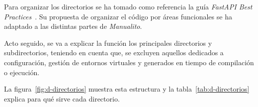 Para organizar los directorios se ha tomado como referencia la guía
\textit{FastAPI Best Practices}~\cite{zhanymkanov_fastapi_best_practices}.
Su propuesta de organizar el código por áreas funcionales se ha adaptado a
las distintas partes de \textit{Manualito}.

Acto seguido, se va a explicar la función los principales directorios y
subdirectorios, teniendo en cuenta que, se excluyen aquellos dedicados a
configuración, gestión de entornos virtuales y generados en tiempo de compilación
o ejecución.

La figura~\ref{fig:d-directorios} muestra esta estructura y la
tabla~\ref{tab:d-directorios} explica para qué sirve cada directorio.


